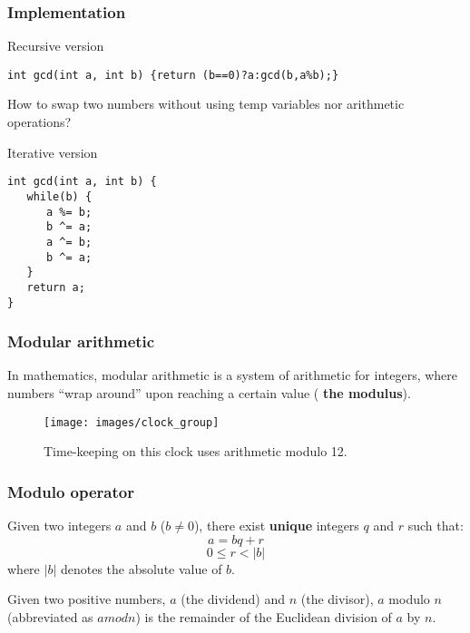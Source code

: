 \documentclass{beamer}
\begin{document}
\begin{frame}[fragile]
\frametitle{Implementation}
\begin{block}{Recursive version}
\begin{lstlisting}
int gcd(int a, int b) {return (b==0)?a:gcd(b,a%b);}
\end{lstlisting}
\end{block}

  How to swap two numbers without using temp variables nor arithmetic operations?
 \begin{block}{Iterative version}
\begin{lstlisting}
int gcd(int a, int b) {
   while(b) {
      a %= b;
      b ^= a;
      a ^= b;
      b ^= a;
   }
   return a;
}
\end{lstlisting}
\end{block}
\end{frame}

\begin{frame}
\frametitle{Modular arithmetic}
\justify In mathematics, modular arithmetic is a system of arithmetic for integers, where numbers ``wrap around'' upon reaching a certain value ( \textbf{the modulus}).
\begin{figure}[t]
		\texttt{[image: images/clock\_group]}
		\caption{Time-keeping on this clock uses arithmetic modulo 12.}
	\end{figure}
\end{frame}

\begin{frame}
\frametitle{Modulo operator}
\begin{theorem}
	Given two integers $a$ and $b$ ($b \neq 0$), there exist \textbf{unique} integers $q$ and $r$ such that:
$$a = bq + r$$
$$ 0 \le r < |b|$$
where $|b|$ denotes the absolute value of $b$.
\end{theorem}
Given two positive numbers, $a$ (the dividend) and $n$ (the divisor), $a$ modulo $n$ (abbreviated as $a mod n$) is the remainder of the Euclidean division of $a$ by $n$.
\end{frame}
\end{document}
